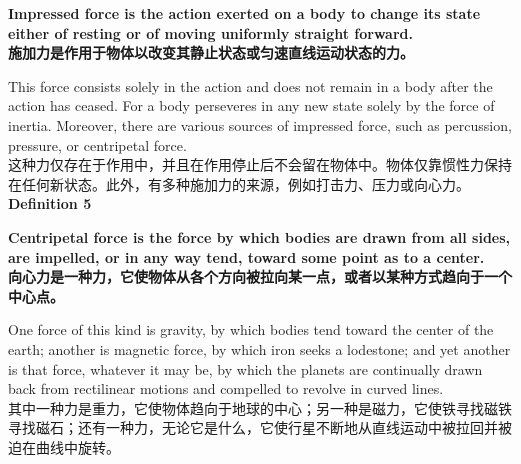 \documentclass{article}
\begin{document}
\noindent \textbf{Impressed force is the action exerted on a body to change its state either of resting or of moving uniformly straight forward.}\\
\noindent \textbf{施加力是作用于物体以改变其静止状态或匀速直线运动状态的力。}\\

\addtolength{\leftskip}{-1cm}
\addtolength{\rightskip}{-1cm}

\noindent This force consists solely in the action and does not remain in a body after the action has ceased. For a body perseveres in any new state solely by the force of inertia. Moreover, there are various sources of impressed force, such as percussion, pressure, or centripetal force.\\
这种力仅存在于作用中，并且在作用停止后不会留在物体中。物体仅靠惯性力保持在任何新状态。此外，有多种施加力的来源，例如打击力、压力或向心力。\\

\noindent\textbf{Definition 5}

\addtolength{\leftskip}{1cm}
\addtolength{\rightskip}{1cm}

\noindent \textbf{Centripetal force is the force by which bodies are drawn from all sides, are impelled, or in any way tend, toward some point as to a center.}\\
\noindent \textbf{向心力是一种力，它使物体从各个方向被拉向某一点，或者以某种方式趋向于一个中心点。}\\

\addtolength{\leftskip}{-1cm}
\addtolength{\rightskip}{-1cm}

\noindent One force of this kind is gravity, by which bodies tend toward the center of the earth; another is magnetic force, by which iron seeks a lodestone; and yet another is that force, whatever it may be, by which the planets are continually drawn back from rectilinear motions and compelled to revolve in curved lines.\\
其中一种力是重力，它使物体趋向于地球的中心；另一种是磁力，它使铁寻找磁铁寻找磁石；还有一种力，无论它是什么，它使行星不断地从直线运动中被拉回并被迫在曲线中旋转。\\
\end{document}
